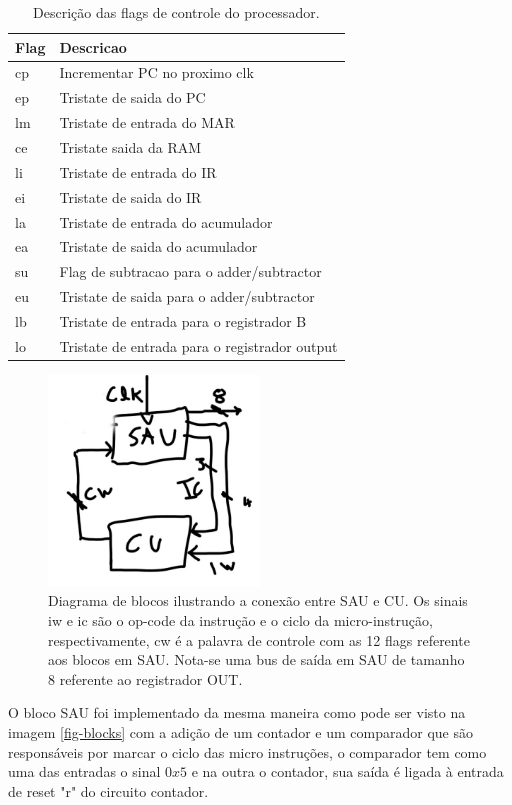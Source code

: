 \documentclass[11pt, twocolumn]{article}
\begin{document}
\begin{table}
  \caption{Descrição das flags de controle do processador.}
\begin{tabular}{ll}
\hline
Flag & Descricao \\
\hline
cp & Incrementar PC no proximo clk \\
ep & Tristate de saida do PC \\
lm & Tristate de entrada do MAR \\
ce & Tristate saida da RAM \\
li & Tristate de entrada do IR \\
ei & Tristate de saida do IR \\
la & Tristate de entrada do acumulador \\
ea & Tristate de saida do acumulador \\
su & Flag de subtracao para o adder/subtractor \\
eu & Tristate de saida para o adder/subtractor \\
lb & Tristate de entrada para o registrador B \\
lo & Tristate de entrada para o registrador output \\
\hline
\end{tabular}
\label{tab-flags}
\end{table}

   \begin{figure}
     \includegraphics[width=0.5\textwidth]{cu.jpg}
     \caption{Diagrama de blocos ilustrando a conexão entre SAU e CU. Os sinais iw e ic são o op-code da instrução e o ciclo da micro-instrução, respectivamente, cw é a palavra de controle com as 12 flags referente aos blocos em SAU. Nota-se uma bus de saída em SAU de tamanho 8 referente ao registrador OUT.}
     \label{fig-cu}
   \end{figure}
 
O bloco SAU foi implementado da mesma maneira como pode ser visto na imagem \ref{fig-blocks} com a adição de um contador e um comparador que são responsáveis por marcar o ciclo das micro instruções, o comparador tem como uma das entradas o sinal $0x5$ e na outra o contador, sua saída é ligada à entrada de reset "r" do circuito contador.
\end{document}
